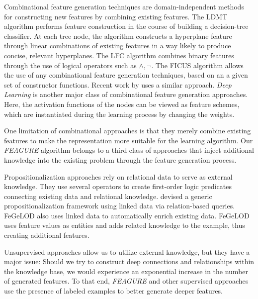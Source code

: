 \documentclass{article}
\theoremstyle{definition}
\begin{document}
Combinational feature generation techniques are domain-independent methods for constructing new features by combining existing features. The LDMT algorithm \citep{utgo1991linear} performs feature construction in the course of building a decision-tree classifier. At each tree node, the algorithm constructs a hyperplane feature through linear combinations of existing features in a way likely to produce concise, relevant hyperplanes. The LFC algorithm \citep{ragavan1993complex} combines binary features through the use of logical operators such as $\land ,\lnot$.
The FICUS algorithm \citep{markovitch2002feature} allows the use of any combinational feature generation techniques, based on an a given set of constructor functions. Recent work by \cite{katz2016explorekit} uses a similar approach.
\emph{Deep Learning} \citep{rumelhart1986learning,lecun1998gradient} is another major class of combinational feature generation approaches. Here, the activation functions of the nodes can be viewed as feature schemes, which are instantiated during the learning process by changing the weights.

One limitation of combinational approaches is that they merely combine existing features to make the representation more suitable for the 
learning algorithm. 
Our \emph{FEAGURE} algorithm belongs to a third class of approaches that inject additional knowledge into the existing problem through the feature generation process.

Propositionalization approaches \citep{kramer2000bottom,cheng2011automatedfull} rely on relational data to serve as external knowledge. They use several operators to create first-order logic predicates connecting existing data and relational knowledge. 
\cite{cheng2011automatedfull} devised a generic propositionalization framework  using linked data via relation-based queries. 
FeGeLOD \citep{paulheim2012unsupervisedfull} also uses linked data to automatically enrich existing data. 
FeGeLOD uses feature values as entities and adds related knowledge to the example, thus creating additional features. 

Unsupervised approaches allow us to utilize external knowledge, but they have a major issue: Should we try to construct deep connections and relationships within the knowledge base, we would experience an exponential increase in the number of generated features.
To that end, \emph{FEAGURE} and other supervised approaches use the presence of labeled examples to better generate deeper features.
\end{document}
